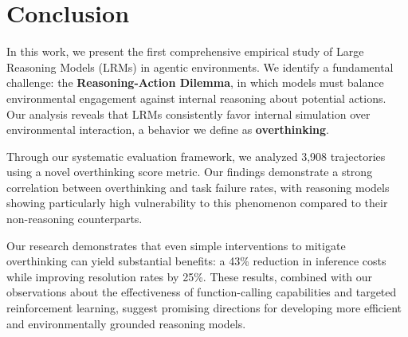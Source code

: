 \chapter{Conclusion}
\label{concl}

In this work, we present the first comprehensive empirical study of Large Reasoning Models (LRMs) in agentic environments. We identify a fundamental challenge: the \textbf{Reasoning-Action Dilemma}, in which models must balance environmental engagement against internal reasoning about potential actions. Our analysis reveals that LRMs consistently favor internal simulation over environmental interaction, a behavior we define as \textbf{overthinking}.

Through our systematic evaluation framework, we analyzed 3,908 trajectories using a novel overthinking score metric. Our findings demonstrate a strong correlation between overthinking and task failure rates, with reasoning models showing particularly high vulnerability to this phenomenon compared to their non-reasoning counterparts.

Our research demonstrates that even simple interventions to mitigate overthinking can yield substantial benefits: a 43\% reduction in inference costs while improving resolution rates by 25\%. These results, combined with our observations about the effectiveness of function-calling capabilities and targeted reinforcement learning, suggest promising directions for developing more efficient and environmentally grounded reasoning models.
